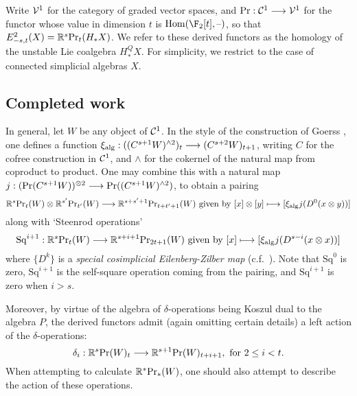 \documentclass[11pt]{article}
\newcommand{\Sq}{\mathrm{Sq}}
\begin{document}
Write $\calV^1$ for the category of graded vector spaces, and $\textup{Pr}:\calC^1\to \calV^1$ for the functor whose value in dimension $t$ is $\Hom(\F_2[t],\DASH)$, so that $E^2_{-s,t}(X)=\mathbb{R}^s\textup{Pr}_t(H_*X)$. We refer to these derived functors as the homology of the unstable Lie coalgebra $H_*^QX$. For simplicity, we restrict to the case of connected simplicial algebras $X$.

\subsection{Completed work}\label{PastWorkOnE2LevelStructure}
In general, let $W$ be any object of $\calC^1$. In the style of the construction of Goerss  \cite[\S5]{MR1089001}, one defines a function $\xi_\textup{alg}:((C^{s+1}W)^{\wedge2})_{t}\to (C^{s+2}W)_{t+1}$, writing $C$ for the cofree construction in $\calC^1$, and $\wedge $ for the cokernel of the natural map from coproduct to product. One may combine this with a natural map $j:(\textup{Pr}(C^{s+1}W))^{\otimes2}\to \textup{Pr}((C^{s+1}W)^{\wedge 2})$, to obtain a pairing
\[\mathbb{R}^s\textup{Pr}_t(W)\otimes \mathbb{R}^{s'}\textup{Pr}_{t'}(W)\to \mathbb{R}^{s+s'+1}\textup{Pr}_{t+t'+1}(W)\textup{ given by }[x]\otimes [y]\mapsto [\xi_{\textup{alg}}j(D^0(x\otimes y))]\]
along with `Steenrod operations'
\[\Sq^{i+1}:\mathbb{R}^s\textup{Pr}_t(W)\to \mathbb{R}^{s+i+1}\textup{Pr}_{2t+1}(W)\textup{ given by }[x]\mapsto [\xi_{\textup{alg}}j(D^{s-i}(x\otimes x))]\]
where $\{D^k\}$ is a \emph{special cosimplicial Eilenberg-Zilber map} (c.f.\ \cite[5.2]{turner_opns_and_sseqs_I.pdf}). Note that $\Sq^0$ is zero, $\Sq^{i+1}$ is the self-square operation coming from the pairing, and $\Sq^{i+1}$ is zero when $i>s$.

Moreover, by virtue of the algebra of $\delta$-operations being Koszul dual to the algebra $P$, the derived functors admit (again omitting certain details) a left action of the $\delta$-operations:
\[\delta_i:\mathbb{R}^s\textup{Pr}(W)_t\to \mathbb{R}^{s+1}\textup{Pr}(W)_{t+i+1},\textup{ for $2\leq i<t$}.\]
When attempting to calculate $\mathbb{R}^*\textup{Pr}_*(W)$, one should also attempt to describe the action of these operations.
\end{document}
